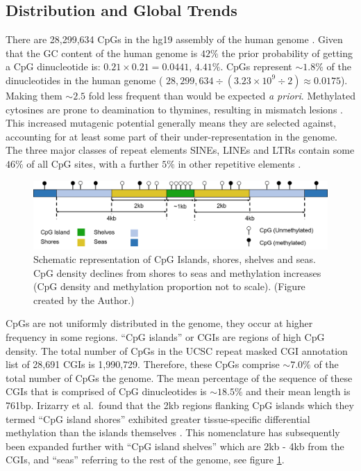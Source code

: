 \documentclass[
]{book}
\begin{document}
\hypertarget{distribution-and-global-trends}{%
\subsection{Distribution and Global Trends}\label{distribution-and-global-trends}}

There are 28,299,634 CpGs \citep{Luo2014} in the hg19 assembly of the human genome \citep{Lander2001}. Given that the GC content of the human genome is \(42\%\) the prior probability of getting a CpG dinucleotide is: \(0.21 \times 0.21 = 0.0441\), \(4.41\%\). CpGs represent \(\sim1.8\%\) of the dinucleotides in the human genome ( \(28,299,634 \div (3.23\times10^9\div2) \approx 0.0175\)). Making them \(\sim2.5\) fold less frequent than would be expected \emph{a priori}. Methylated cytosines are prone to deamination to thymines, resulting in mismatch lesions \citep{Duncan1980}. This increased mutagenic potential generally means they are selected against, accounting for at least some part of their under-representation in the genome. The three major classes of repeat elements SINEs, LINEs and LTRs contain some \(46\%\) of all CpG sites, with a further \(5\%\) in other repetitive elements \citep{Luo2014}.

\begin{figure}
\includegraphics[width=26.28in]{figs/CGI-Shores-Shelves-Seas_2} \caption{Schematic representation of CpG Islands, shores, shelves and seas. CpG density declines from shores to seas and methylation increases (CpG density and methylation proportion not to scale). (Figure created by the Author.)}\label{fig:CGIs}
\end{figure}



CpGs are not uniformly distributed in the genome, they occur at higher frequency in some regions. ``CpG islands'' or CGIs are regions of high CpG density. The total number of CpGs in the UCSC repeat masked CGI annotation list of 28,691 CGIs is 1,990,729. Therefore, these CpGs comprise \(\sim7.0\%\) of the total number of CpGs the genome. The mean percentage of the sequence of these CGIs that is comprised of CpG dinucleotides is \(\sim18.5\%\) and their mean length is 761bp. Irizarry et al.~found that the 2kb regions flanking CpG islands which they termed ``CpG island shores'' exhibited greater tissue-specific differential methylation than the islands themselves \citep{Irizarry2009}. This nomenclature has subsequently been expanded further with ``CpG island shelves'' which are 2kb - 4kb from the CGIs, and ``seas'' referring to the rest of the genome, see figure \ref{fig:CGIs}.
\end{document}
